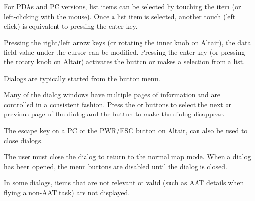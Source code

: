\documentclass[a4paper,12pt]{refrep}
\begin{document}
For PDAs and PC versions, list items can be selected by touching the item (or
left-clicking with the mouse). Once a list item is selected, another touch
(left click) is equivalent to pressing the enter key.

Pressing the right/left arrow keys (or rotating the inner knob on Altair), the
data field value under the cursor can be modified. Pressing the enter key (or
pressing the rotary knob on Altair) activates the button or makes a selection
from a list.

Dialogs are typically started from the button menu.  

Many of the dialog windows have multiple pages of information and are controlled
in a consistent fashion. Press the \button{$<$} or \button{$>$} buttons to
select the next or previous page of the dialog and the  button to
make the dialog disappear.

The escape key on a PC or the PWR/ESC button on Altair, can also be used to
close dialogs.

The user must close the dialog to return to the normal map mode. When a dialog
has been opened, the menu buttons are disabled until the dialog is closed.

In some dialogs, items that are not relevant or valid (such as AAT details when
flying a non-AAT task) are not displayed.
\end{document}
